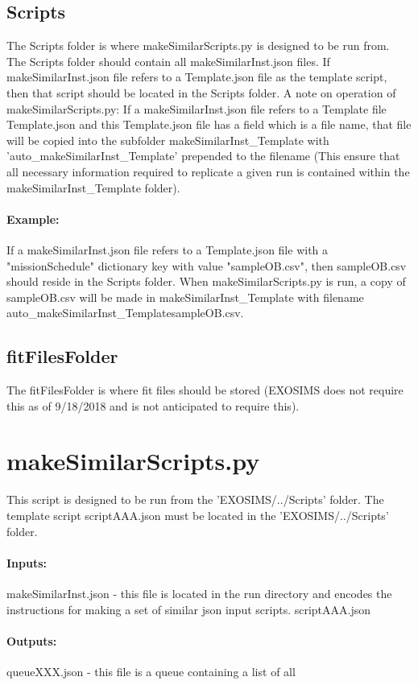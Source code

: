 \documentclass[12pt]{article}
\begin{document}
\subsection{Scripts}
The Scripts folder is where makeSimilarScripts.py is designed to be run from.
The Scripts folder should contain all makeSimilarInst.json files.
If makeSimilarInst.json file refers to a Template.json file as the template script, then that script should be located in the Scripts folder.
A note on operation of makeSimilarScripts.py: If a makeSimilarInst.json file refers to a Template file Template.json and this Template.json file has a field which is a file name, that file will be copied into the subfolder makeSimilarInst\_Template with 'auto\_makeSimilarInst\_Template' prepended to the filename (This ensure that all necessary information required to replicate a given run is contained within the makeSimilarInst\_Template folder).
\paragraph{Example:} If a makeSimilarInst.json file refers to a Template.json file with a "missionSchedule" dictionary key with value "sampleOB.csv", then sampleOB.csv should reside in the Scripts folder.
When makeSimilarScripts.py is run, a copy of sampleOB.csv will be made in makeSimilarInst\_Template with filename auto\_makeSimilarInst\_TemplatesampleOB.csv.
\subsection{fitFilesFolder}
The fitFilesFolder is where fit files should be stored (EXOSIMS does not require this as of 9/18/2018 and is not anticipated to require this).


\section{makeSimilarScripts.py}
This script is designed to be run from the 'EXOSIMS/../Scripts' folder.
The template script scriptAAA.json must be located in the 'EXOSIMS/../Scripts' folder.
\paragraph{Inputs:}
makeSimilarInst.json - this file is located in the run directory and encodes the instructions for making a set of similar json input scripts.
scriptAAA.json
\paragraph{Outputs:}
queueXXX.json - this file is a queue containing a list of all
\end{document}

